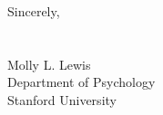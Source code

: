 \documentclass{letter}
\begin{document}
\begin{letter}


Sincerely,\\
\\
\\
Molly L. Lewis\\
Department of Psychology\\
Stanford University\\

\end{letter}
\end{document}
